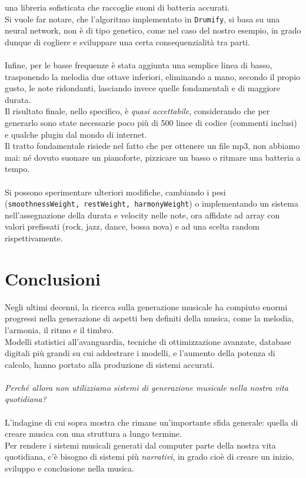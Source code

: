 \documentclass[a4paper,12pt]{report}
\begin{document}
una libreria sofisticata che raccoglie suoni di batteria accurati. \\
Si vuole far notare, che l'algoritmo implementato in \texttt{Drumify}, si basa su una neural network, non è di tipo genetico, come nel caso del nostro esempio, in grado dunque di cogliere e sviluppare una certa consequenzialità tra parti. \\
\\
Infine, per le basse frequenze è stata aggiunta una semplice linea di basso, trasponendo la melodia due ottave inferiori, eliminando a mano, secondo il propio gusto, le note ridondanti, lasciando invece quelle fondamentali e di maggiore durata. \\
Il risultato finale, nello specifico, è \textit{quasi accettabile}, considerando che per generarlo sono state necessarie poco più di 500 linee di codice (commenti inclusi) e qualche plugin dal mondo di internet. \\
Il tratto fondamentale risiede nel fatto che per ottenere un file mp3, non abbiamo mai: né dovuto suonare un pianoforte, pizzicare un basso o ritmare una batteria a tempo. \\
\\
Si possono sperimentare ulteriori modifiche, cambiando i pesi (\texttt{smoothnessWeight, restWeight, harmonyWeight}) o implementando un sistema nell'assegnazione della durata e velocity nelle note, ora affidate ad array con valori prefissati (rock, jazz, dance, bossa nova) e ad una scelta random rispettivamente.

\chapter{Conclusioni}
Negli ultimi decenni, la ricerca sulla generazione musicale ha compiuto enormi progressi nella generazione di aspetti ben definiti della musica, come la melodia, l’armonia, il ritmo e il timbro. \\
Modelli statistici all’avanguardia, tecniche di ottimizzazione avanzate, database digitali più grandi su cui addestrare i modelli, e l’aumento della potenza di calcolo, hanno portato alla produzione di sistemi accurati. \\
\\
\textit{Perché allora non utilizziamo sistemi di generazione musicale nella nostra vita quotidiana?} \\
\\
L’indagine di cui sopra mostra che rimane un’importante sfida generale: quella di creare musica con una struttura a lungo termine. \\
Per rendere i sistemi musicali generati dal computer parte della nostra vita quotidiana, c’è bisogno di sistemi più \textit{narrativi}, in grado cioè di creare un inizio, sviluppo e conclusione nella musica. \\
\end{document}
